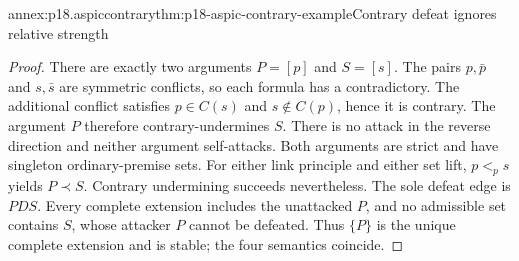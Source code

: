 \begin{annexitem}{annex:p18.aspiccontrary}{thm:p18-aspic-contrary-example}{Contrary defeat ignores relative strength}
\begin{proof}
There are exactly two arguments \(P=[p]\) and \(S=[s]\).
The pairs \(p,\bar p\) and \(s,\bar s\) are symmetric conflicts, so
each formula has a contradictory. The additional conflict satisfies
\(p\in C(s)\) and \(s\notin C(p)\), hence it is contrary.
The argument \(P\) therefore contrary-undermines \(S\).
There is no attack in the reverse direction and neither argument
self-attacks.
Both arguments are strict and have singleton ordinary-premise sets.
For either link principle and either set lift, \(p<_p s\) yields
\(P\prec S\). Contrary undermining succeeds nevertheless.
The sole defeat edge is \(P D S\). Every complete extension includes
the unattacked \(P\), and no admissible set contains \(S\), whose
attacker \(P\) cannot be defeated. Thus \(\{P\}\) is the unique complete
extension and is stable; the four semantics coincide.
\end{proof}
\end{annexitem}

